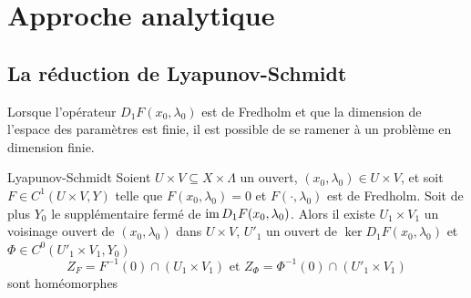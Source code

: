 \documentclass[memoire.tex]{subfiles}
\begin{document}
\section{Approche analytique}
\subsection{La réduction de Lyapunov-Schmidt}
Lorsque l'opérateur $D_1F(x_0,\lambda_0)$ est de Fredholm et que la 
dimension de l'espace des paramètres est finie, il est possible de se 
ramener à un problème en dimension finie.
\begin{theobox}{Lyapunov-Schmidt}{}\label{LP-redux}
Soient $U\times V\subseteq X\times \Lambda $ un ouvert, $(x_0,\lambda_0)\in  U\times V$, et soit $F\in C^1(U\times V,Y)$ telle que $F(x_0,
\lambda_0)=0$ et $F(\cdot,\lambda_0)$ est de Fredholm. Soit de plus $Y_0$ le supplémentaire fermé de $\operatorname{im} D_1F(x_0,\lambda_0)$. Alors il existe $U_1\times V_1$ un voisinage ouvert de $(x_0,\lambda_0)$ dans $U\times V$,  $U'_1$  un ouvert de $\ker D_1 F(x_0,\lambda_0)$ et $\Phi\in C^0(U'_1\times V_1,Y_0)$
\begin{equation*}
    Z_F=F^{-1}(0)\cap (U_1\times V_1)\text{ et } Z_\Phi=\Phi^{-1}(0)\cap(U'_1\times V_1)
\end{equation*} 
sont homéomorphes
\end{theobox}
\end{document}
